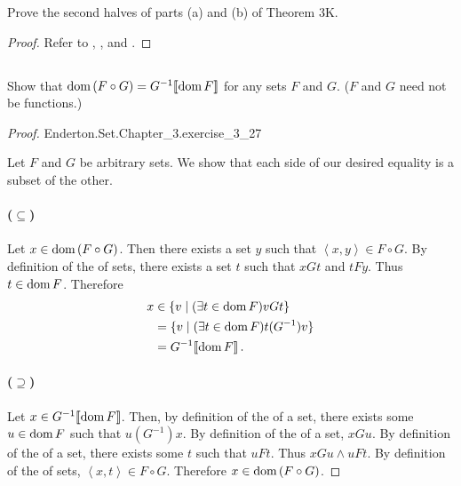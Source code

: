 \documentclass{report}
\newcommand{\pair}[1]{\left< #1 \right>}
\begin{document}
Prove the second halves of parts (a) and (b) of Theorem 3K.

\begin{proof}

  Refer to , , and
    .

\end{proof}

\subsection{}%

Show that $\mathop{\text{dom}}{(F \circ G)} = G^{-1}\!\left\llbracket\mathop{\text{dom}}{F}\right\rrbracket$ for any sets $F$ and $G$.
($F$ and $G$ need not be functions.)

\begin{proof}

    {Enderton.Set.Chapter\_3.exercise\_3\_27}

  Let $F$ and $G$ be arbitrary sets.
  We show that each side of our desired equality is a subset of the other.

  \paragraph{($\subseteq$)}%

    Let $x \in \mathop{\text{dom}}{(F \circ G)}$.
    Then there exists a set $y$ such that $\pair{x, y} \in F \circ G$.
    By definition of the  of sets, there exists a set
      $t$ such that $xGt$ and $tFy$.
    Thus $t \in \mathop{\text{dom}}{F}$.
    Therefore
      \begin{align*}
        x
          & \in \{v \mid (\exists t \in \mathop{\text{dom}}{F}) vGt\} \\
          & = \{v \mid (\exists t \in \mathop{\text{dom}}{F}) t(G^{-1})v\} \\
          & = G^{-1}\!\left\llbracket\mathop{\text{dom}}{F}\right\rrbracket.
      \end{align*}

  \paragraph{($\supseteq$)}%

    Let $x \in G^{-1}\!\left\llbracket\mathop{\text{dom}}{F}\right\rrbracket$.
    Then, by definition of the  of a set, there exists some
      $u \in \mathop{\text{dom}}{F}$ such that $u(G^{-1})x$.
    By definition of the  of a set, $xGu$.
    By definition of the  of a set, there exists some $t$
      such that $uFt$.
    Thus $xGu \land uFt$.
    By definition of the  of sets,
      $\pair{x, t} \in F \circ G$.
    Therefore $x \in \mathop{\text{dom}}{(F \circ G)}$.

\end{proof}
\end{document}
